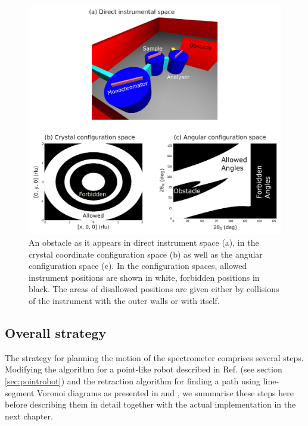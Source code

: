 \begin{figure}[htb]
	\centering
	\includegraphics[width = 0.95 \textwidth]{figures/tas_wall.jpg}
	\caption[TAS configuration spaces.]{
		An obstacle as it appears in direct instrument space (a), in the 
		crystal coordinate configuration space (b) as well as the angular
		configuration space (c).
		In the configuration spaces, allowed instrument positions are 
		shown in white, forbidden positions in black. 
		The areas of disallowed positions are given either by collisions 
		of the instrument with the outer walls or with itself.}
	\label{fig:tas_wall}
\end{figure}


\subsection{Overall strategy}
\label{sec:strategy}

The strategy for planning the motion of the spectrometer comprises several steps. 
Modifying the algorithm for a point-like robot described in Ref. 
\cite[Ch. 13, pp. 283-306]{Berg2008} (see section \ref{sec:pointrobot}) and the 
retraction algorithm for finding a path using line-segment Voronoi diagrams as 
presented in \cite[p. 163]{Berg2008} and \cite[Ch. 5.4.3, pp. 247-251]{FUH_geo2020}, we
summarise these steps here before describing them in detail together with the actual
implementation in the next chapter.


